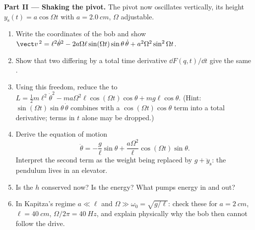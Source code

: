 \begin{problem}
\medskip\noindent\textbf{Part II --- Shaking the pivot.}
The pivot now oscillates vertically, its height $y_{\text{s}}(t) =
a\cos\Omega t$ with $a = \qty{2.0}{cm}$, $\Omega$ adjustable.
\begin{enumerate}[resume]
  \item Write the coordinates of the bob and show
        $\vect v^{\,2} = \ell^2\dot\theta^2 -
        2a\Omega\ell\sin(\Omega t)\sin\theta\,\dot\theta +
        a^2\Omega^2\sin^2\Omega t$.
  \item Show that two  differing by a total time derivative
        $\dd F(q,t)/\dd t$ give the same .
  \item Using this freedom, reduce the  to $L = \tfrac12 m
        \ell^2\dot\theta^2 - ma\Omega^2\ell\cos(\Omega t)\cos\theta +
        mg\ell\cos\theta$. (Hint: $\sin(\Omega t)\sin\theta\,\dot\theta$
        combines with a $\cos(\Omega t)\cos\theta$ term into a total
        derivative; terms in $t$ alone may be dropped.)
  \item Derive the equation of motion
        \[
        \ddot\theta = -\frac{g}{\ell}\sin\theta
         + \frac{a\Omega^2}{\ell}\cos(\Omega t)\sin\theta .
        \]
        Interpret the second term as the weight being replaced by $g +
        \ddot y_{\text{s}}$: the pendulum lives in an elevator.
  \item Is the  $h$ conserved now? Is the energy? What
        pumps energy in and out?
  \item In Kapitza's regime $a \ll \ell$ and $\Omega \gg \omega_0 =
        \sqrt{g/\ell}$: check these for $a = \qty{2}{cm}$, $\ell =
        \qty{40}{cm}$, $\Omega/2\pi = \qty{40}{Hz}$, and explain
        physically why the bob then cannot follow the drive.
\end{enumerate}


\end{problem}
